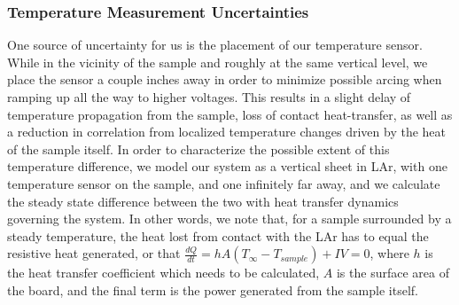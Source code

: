 \documentclass[a4paper,12pt]{article}
\begin{document}
\subsubsection{Temperature Measurement Uncertainties}
One source of uncertainty for us is the placement of our temperature sensor. While in the vicinity of the sample and roughly at the same vertical level, we place the sensor a couple inches away in order to minimize possible arcing when ramping up all the way to higher voltages. This results in a slight delay of temperature propagation from the sample, loss of contact heat-transfer, as well as a reduction in correlation from localized temperature changes driven by the heat of the sample itself. In order to characterize the possible extent of this temperature difference, we model our system as a vertical sheet in LAr, with one temperature sensor on the sample, and one infinitely far away, and we calculate the steady state difference between the two with heat transfer dynamics governing the system. In other words, we note that, for a sample surrounded by a steady temperature, the heat lost from contact with the LAr has to equal the resistive heat generated, or that $\frac{dQ}{dt}=hA(T_{\infty}-T_{sample})+IV=0$, where $h$ is the heat transfer coefficient which needs to be calculated, $A$ is the surface area of the board, and the final term is the power generated from the sample itself.
\end{document}
